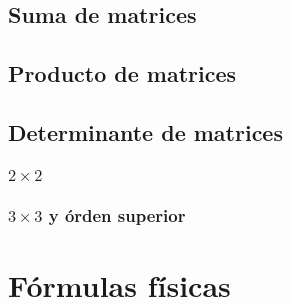 \documentclass[12pt,spanish,lettersize]{report}
\begin{document}
\section{Suma de matrices}
\section{Producto de matrices}
\section{Determinante de matrices}
\subsection{$2\times 2$}
\subsection{$3\times 3$ y \'orden superior}
\chapter{F\'ormulas f\'isicas}
\end{document}
